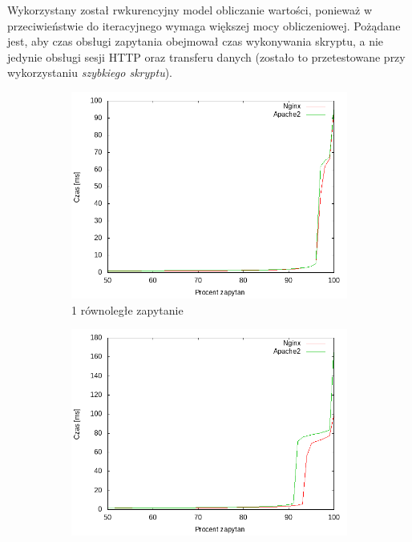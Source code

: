 Wykorzystany został rwkurencyjny model obliczanie wartości, ponieważ w przeciwieństwie do iteracyjnego wymaga większej mocy obliczeniowej.
Pożądane jest, aby czas obsługi zapytania obejmował czas wykonywania skryptu, a nie jedynie obsługi sesji HTTP oraz transferu danych (zostało to przetestowane przy wykorzystaniu \textit{szybkiego skryptu}).

\begin{figure}
	\centering
	\begin{subfigure}[h]{0.3\textwidth}
		\includegraphics[width=\textwidth]{testy/wybor_fib_5_1.png}
		\caption{1 równoległe zapytanie}
	\end{subfigure}
	\begin{subfigure}[h]{0.3\textwidth}
		\includegraphics[width=\textwidth]{testy/wybor_fib_5_2.png}

\end{subfigure}
\end{figure}
